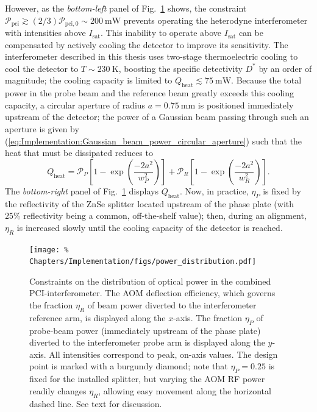 However, as the \emph{bottom-left} panel of
Fig.~\ref{fig:Implementation:power_distribution} shows,
the constraint
$\mathcal{P}_{\text{pci}}
\gtrsim
(2 / 3) \mathcal{P}_{\text{pci},0}
\sim \SI{200}{\milli\watt}$
prevents operating the heterodyne interferometer
with intensities above $I_{\text{sat}}$.
This inability to operate above $I_{\text{sat}}$ can be compensated
by actively cooling the detector to improve its sensitivity.
\graffito{\textcolor{red}{Describe elsewhere?}}
The interferometer described in this thesis
uses two-stage thermoelectric cooling
to cool the detector to $T \sim \SI{230}{\kelvin}$,
boosting the specific detectivity $D^*$ by an order of magnitude;
the cooling capacity is limited to
$Q_{\text{heat}} \lesssim \SI{75}{\milli\watt}$.
Because the total power in the probe beam and the reference beam
greatly exceeds this cooling capacity,
a circular aperture of radius $a = \SI{0.75}{\milli\meter}$
is positioned immediately upstream of the detector;
the power of a Gaussian beam passing through such an aperture is given by
(\ref{eq:Implementation:Gaussian_beam_power_circular_aperture})
such that the heat that must be dissipated reduces to
\begin{equation}
  Q_{\text{heat}}
  =
  \mathcal{P}_P
  \left[ 1 - \exp\left( \frac{-2 a^2}{w_P^2} \right) \right]
  +
  \mathcal{P}_R
  \left[ 1 - \exp\left( \frac{-2 a^2}{w_R^2} \right) \right].
\end{equation}
The \emph{bottom-right} panel of
Fig.~\ref{fig:Implementation:power_distribution}
displays $Q_{\text{heat}}$.
Now, in practice, $\eta_P$ is fixed by the reflectivity
of the ZnSe splitter located upstream of the phase plate
(with $25\%$ reflectivity being a common, off-the-shelf value);
then, during an alignment, $\eta_R$ is increased slowly
until the cooling capacity of the detector is reached.

\begin{figure}
  \centering
  \texttt{[image: \%
    Chapters/Implementation/figs/power\_distribution.pdf]}
  \caption[Constraints on the distribution of optical power]{%
    Constraints on the distribution of optical power
    in the combined PCI-interferometer.
    The AOM deflection efficiency,
    which governs the fraction $\eta_R$
    of beam power diverted to the interferometer reference arm,
    is displayed along the $x$-axis.
    The fraction $\eta_P$ of probe-beam power
    (immediately upstream of the phase plate)
    diverted to the interferometer probe arm
    is displayed along the $y$-axis.
    All intensities correspond to peak, on-axis values.
    The design point is marked with a burgundy diamond;
    note that $\eta_P = 0.25$ is fixed for the installed splitter, but
    varying the AOM RF power readily changes $\eta_R$,
    allowing easy movement along the horizontal dashed line.
    See text for discussion.
  }
\label{fig:Implementation:power_distribution}
\end{figure}


